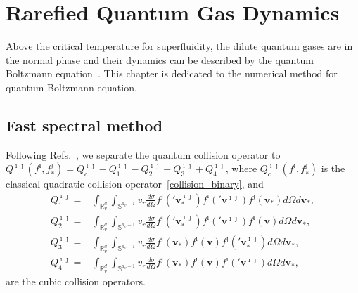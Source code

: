 \chapter{Rarefied Quantum Gas Dynamics}
\label{chap:quantum_fermi}

Above the critical temperature for superfluidity, the dilute quantum gases are in the normal phase and their dynamics can be described by the quantum Boltzmann equation~\cite{Uehling1933}. 
This chapter is dedicated to the numerical method for quantum Boltzmann equation.




\section{Fast spectral method}

Following Refs.~\cite{Filbet2012a,Hu2012}, we separate the quantum collision operator to $
Q^{\imath\jmath}(f^\imath,f^\jmath_*)=Q_c^{\imath\jmath}-Q_1^{\imath\jmath}-Q_2^{\imath\jmath}+Q_3^{\imath\jmath}+Q_4^{\imath\jmath}
$,
where $Q_c^{\imath\jmath}(f^\imath,f^\jmath_*)$
is the classical quadratic collision operator~\eqref{collision_binary}, and  
\begin{equation}
\begin{split}
Q_1^{\imath\jmath}=&
\int_{\mathbb{R}^d_v}\int_{\mathbb{S}^{d_v-1}}{v_r}\frac{d\sigma}{d\Omega}
f^\jmath('\bm{v}^{\imath\jmath}_{\ast})f^\imath('\bm{v}^{\imath\jmath})f^\jmath(\bm{v}_{\ast})d\Omega{}d\bm{v}_\ast, \\
Q_2^{\imath\jmath}= &
\int_{\mathbb{R}^d_v}\int_{\mathbb{S}^{d_v-1}}{v_r}\frac{d\sigma}{d\Omega}
f^\jmath('\bm{v}^{\imath\jmath}_{\ast})f^\imath('\bm{v}^{\imath\jmath})f^\imath(\bm{v})d\Omega{}d\bm{v}_\ast, \\
Q_3^{\imath\jmath}=&
\int_{\mathbb{R}^d_v}\int_{\mathbb{S}^{d_v-1}}{v_r}\frac{d\sigma}{d\Omega}
f^\jmath(\bm{v}_{\ast})f^\imath(\bm{v})f^\jmath('\bm{v}^{\imath\jmath}_{\ast})d\Omega{}d\bm{v}_\ast, \\
Q_4^{\imath\jmath}=&
\int_{\mathbb{R}^d_v}\int_{\mathbb{S}^{d_v-1}}{v_r}\frac{d\sigma}{d\Omega}f^\jmath(\bm{v}_{\ast})f^\imath(\bm{v})f^\imath('\bm{v}^{\imath\jmath})d\Omega{}d\bm{v}_\ast,
\end{split}
\end{equation}
are the cubic collision operators.


